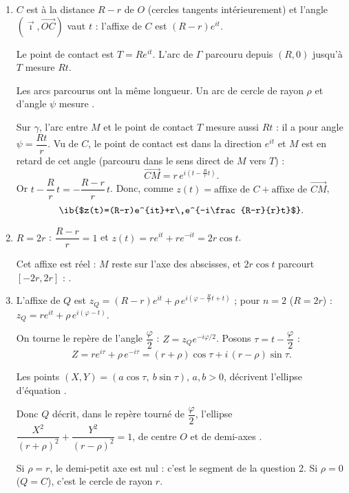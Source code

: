 \begin{enumerate}[itemsep=14pt]
  \item $C$ est à la distance $R-r$ de $O$ (cercles tangents intérieurement) et l'angle $\left(\vec\imath,\overrightarrow{OC}\right)$ vaut $t$ : l'affixe de $C$ est $(R-r)e^{it}$.

  Le point de contact est $T=Re^{it}$. L'arc de $\Gamma$ parcouru depuis $(R,0)$ jusqu'à $T$ mesure $Rt$.

  \begin{prop}
  Les arcs parcourus ont la même longueur. Un arc de cercle de rayon $\rho$ et d'angle $\psi$ mesure \ib{$\rho\,\psi$}.
  \end{prop}
  Sur $\gamma$, l'arc entre $M$ et le point de contact $T$ mesure aussi $Rt$ : il a pour angle $\psi=\dfrac{Rt}{r}$. Vu de $C$, le point de contact est dans la direction $e^{it}$ et $M$ est en retard de cet angle (parcouru dans le sens direct de $M$ vers $T$) :
  \[\overrightarrow{CM}=r\,e^{i\left(t-\frac{R}{r}t\right)}.\]
  Or $t-\dfrac Rr\,t=-\dfrac{R-r}{r}\,t$. Donc, comme $z(t)=\text{affixe de }C+\text{affixe de }\overrightarrow{CM}$,
  \[\ib{$z(t)=(R-r)e^{it}+r\,e^{-i\frac{R-r}{r}t}$}.\]

  \item $R=2r$ : $\dfrac{R-r}{r}=1$ et $z(t)=r e^{it}+r e^{-it}=2r\cos t$.

  Cet affixe est réel : $M$ reste sur l'axe des abscisses, et $2r\cos t$ parcourt $[-2r,2r]$ : .

  \item L'affixe de $Q$ est $z_Q=(R-r)e^{it}+\rho\,e^{i\left(\varphi-\frac{R}{r}t+t\right)}$ ; pour $n=2$ ($R=2r$) : $z_Q=r e^{it}+\rho\,e^{i(\varphi-t)}$.

  On tourne le repère de l'angle $\dfrac\varphi2$ : $Z=z_Qe^{-i\varphi/2}$. Posons $\tau=t-\dfrac\varphi2$ :
  \[Z=r e^{i\tau}+\rho\,e^{-i\tau}=(r+\rho)\cos\tau+i\,(r-\rho)\sin\tau.\]
  \begin{prop}[Ellipse]
  Les points $(X,Y)=(a\cos\tau,\ b\sin\tau)$, $a,b>0$, décrivent l'ellipse d'équation .
  \end{prop}
  Donc $Q$ décrit, dans le repère tourné de $\dfrac\varphi2$, l'ellipse $\dfrac{X^2}{(r+\rho)^2}+\dfrac{Y^2}{(r-\rho)^2}=1$, de centre $O$ et de demi-axes .

  Si $\rho=r$, le demi-petit axe est nul : c'est le segment de la question 2. Si $\rho=0$ ($Q=C$), c'est le cercle de rayon $r$.


\end{enumerate}
